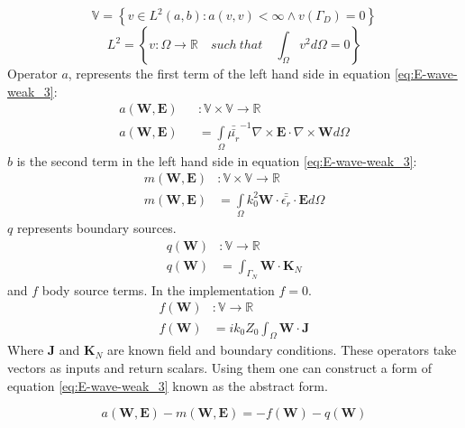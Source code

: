 $$ \mathbb{V}=\left\lbrace v\in L^2(a,b):a(v,v)<\infty\wedge v(\Gamma_D)=0\right\rbrace$$
$$L^2 =\left\lbrace v: \Omega \rightarrow \mathbb{R}\quad such \ that\quad \int_{\Omega}v^2d\Omega =0\right\rbrace$$ 
Operator $a$, represents the first term of the left hand side in equation \ref{eq:E-wave-weak_3}:
\begin{equation}
\begin{array}{rcl}
      a(\mathbf{W},\mathbf{E})&&:\mathbb{V}\times \mathbb{V}\rightarrow \mathbb{R}\\
      a(\mathbf{W},\mathbf{E})&&= \int\limits_{\Omega}  \bar{\bar{\mu_r}}^{-1}\nabla\times \mathbf{E}\cdot \nabla\times\mathbf{W} d\Omega
\label{eq:a_def}
\end{array}
\end{equation}
$b$ is the second term in the left hand side in equation \ref{eq:E-wave-weak_3}:
\begin{equation}
\begin{array}{rcl}
      m(\mathbf{W},\mathbf{E})&:\mathbb{V}\times \mathbb{V}\rightarrow \mathbb{R}\\
      m(\mathbf{W},\mathbf{E})&= \int\limits_{\Omega} k_0^{2}\mathbf{W}\cdot \bar{\bar{\epsilon_r}}\cdot \mathbf{E} d\Omega
\label{eq:m_def}
\end{array}
\end{equation}
$q$ represents boundary sources.
\begin{equation}
\begin{array}{rcl}
      q(\mathbf{W})&:\mathbb{V}\rightarrow \mathbb{R}\\
      q(\mathbf{W})&=\int_{\Gamma_N} \mathbf{W} \cdot\mathbf{K}_N
\label{eq:m_def}
\end{array}
\end{equation}
and $f$ body source terms. In the implementation $f=0$.
\begin{equation}
\begin{array}{rcl}
      f(\mathbf{W})&:\mathbb{V}\rightarrow \mathbb{R}\\
      f(\mathbf{W})&=ik_0Z_0 \int_{\Omega} \mathbf{W}\cdot\mathbf{J}
\label{eq:m_def}
\end{array}
\end{equation}
Where $\mathbf{J}$ and $\mathbf{K}_N$ are known field and boundary conditions.
These operators take vectors as inputs and return scalars. Using them one can construct a form of equation \ref{eq:E-wave-weak_3} known as the abstract form.

\begin{equation}
a(\mathbf{W},\mathbf{E}) - m(\mathbf{W},\mathbf{E}) = -f(\mathbf{W})-q(\mathbf{W})
\label{eq:abstract_E_wave}
\end{equation}

